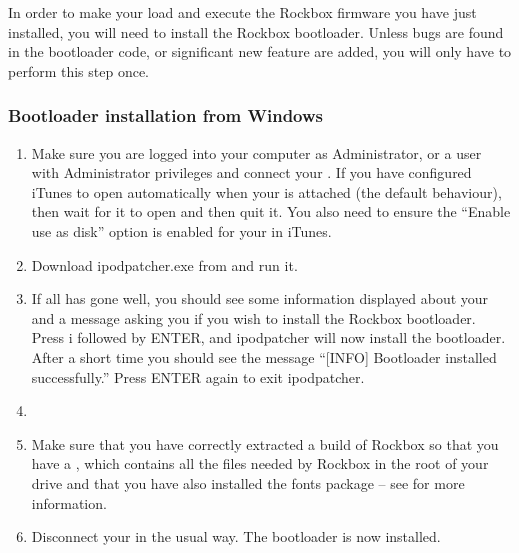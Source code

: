 

In order to make your \dap{} load and execute the Rockbox firmware you
have just installed, you will need to install the Rockbox
bootloader. Unless bugs are found in the bootloader code, or
significant new feature are added, you will only have to perform this
step once.

\subsubsection{Bootloader installation from Windows}

\begin{enumerate}

\item Make sure you are logged into your computer as Administrator, or a 
user with Administrator privileges and connect your \dap{}. If you have
configured iTunes to open automatically when your \dap{} is attached
(the default behaviour), then wait for it to open and then quit it. You
also need to ensure the ``Enable use as disk'' option is enabled for
your \dap{} in iTunes.

\item Download ipodpatcher.exe from 
and run it.

\item If all has gone well, you should see some information displayed about
your \dap{} and a message asking you if you wish to install the Rockbox
bootloader. Press i followed by ENTER, and ipodpatcher will now
install the bootloader. After a short time you should see the message
``[INFO] Bootloader installed successfully.'' Press ENTER again to exit
ipodpatcher.

\item {}

\item Make sure that you have correctly extracted a build of Rockbox so that
you have a , which contains all the files needed by Rockbox
in the root of your \daps{} drive and that you have also installed the fonts
package -- see  for more information.

\item Disconnect your \dap{} in the usual way. The bootloader is now installed. 

\end{enumerate}

